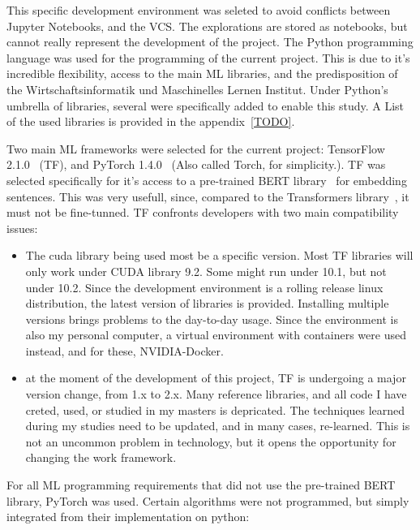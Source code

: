 This specific development environment was seleted to avoid conflicts between Jupyter Notebooks, and the VCS. The explorations are stored as notebooks, but cannot really represent the development of the project.
The Python programming language was used for the programming of the current project. This is due to it's incredible flexibility, access to the main ML libraries, and the predisposition of the Wirtschaftsinformatik und Maschinelles Lernen Institut. Under Python's umbrella of libraries, several were specifically added to enable this study. A List of the used libraries is provided in the appendix~\ref{TODO}.

Two main ML frameworks were selected for the current project: TensorFlow 2.1.0~\cite{tensorflow2015whitepaper} (TF), and PyTorch 1.4.0~\cite{pytorch2019} (Also called Torch, for simplicity.). TF was selected specifically for it's access to a pre-trained BERT library~\cite{lai2015bertembedding} for embedding sentences. This was very usefull, since, compared to the Transformers library~\cite{wolf2019huggingface}, it must not be fine-tunned. TF confronts developers with two main compatibility issues:

\begin{itemize}
  \item The cuda library being used most be a specific version. Most TF libraries will only work under CUDA library 9.2. Some might run under 10.1, but not under 10.2. Since the development environment is a rolling release linux distribution, the latest version of libraries is provided. Installing multiple versions brings problems to the day-to-day usage. Since the environment is also my personal computer, a virtual environment with containers were used instead, and for these, NVIDIA-Docker.

  \item at the moment of the development of this project, TF is undergoing a major version change, from 1.x to 2.x. Many reference libraries, and all code I have creted, used, or studied in my masters is depricated. The techniques learned during my studies need to be updated, and in many cases, re-learned.
  This is not an uncommon problem in technology, but it opens the opportunity for changing the work framework.
\end{itemize}

For all ML programming requirements that did not use the pre-trained BERT library, PyTorch was used. Certain algorithms were not programmed, but simply integrated from their implementation on python:

